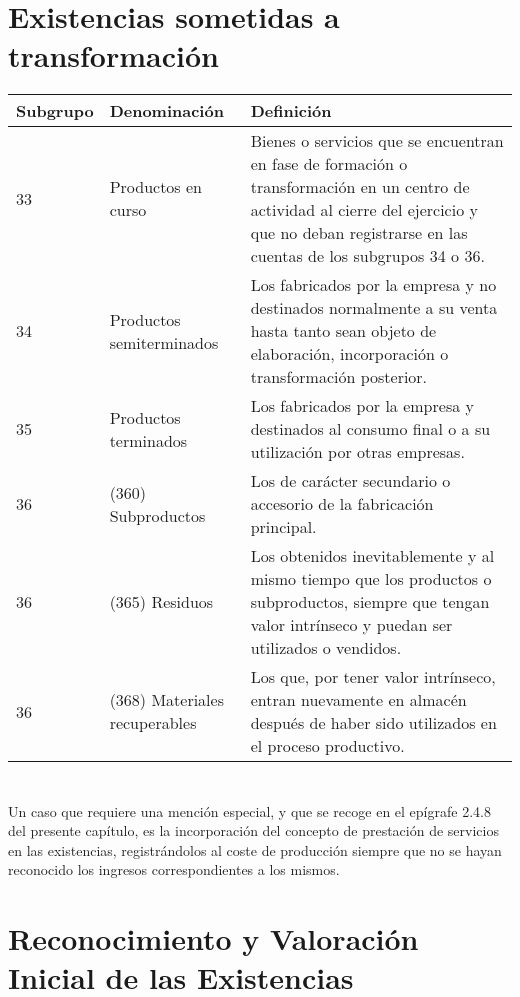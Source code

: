 \documentclass{article}
\begin{document}
\section*{Existencias sometidas a transformación}

\begin{tabular}{|p{4cm}|p{4cm}|p{4cm}|}
\hline
\textbf{Subgrupo} & \textbf{Denominación} & \textbf{Definición} \\
\hline
33 & Productos en curso & Bienes o servicios que se encuentran en fase de formación o transformación en un centro de actividad al cierre del ejercicio y que no deban registrarse en las cuentas de los subgrupos 34 o 36. \\
\hline
34 & Productos semiterminados & Los fabricados por la empresa y no destinados normalmente a su venta hasta tanto sean objeto de elaboración, incorporación o transformación posterior. \\
\hline
35 & Productos terminados & Los fabricados por la empresa y destinados al consumo final o a su utilización por otras empresas. \\
\hline
36 & (360) Subproductos & Los de carácter secundario o accesorio de la fabricación principal. \\
\hline
36 & (365) Residuos & Los obtenidos inevitablemente y al mismo tiempo que los productos o subproductos, siempre que tengan valor intrínseco y puedan ser utilizados o vendidos. \\
\hline
36 & (368) Materiales recuperables & Los que, por tener valor intrínseco, entran nuevamente en almacén después de haber sido utilizados en el proceso productivo. \\
\hline
\end{tabular}

\section*{}

Un caso que requiere una mención especial, y que se recoge en el epígrafe 2.4.8 del presente capítulo, es la incorporación del concepto de prestación de servicios en las existencias, registrándolos al coste de producción siempre que no se hayan reconocido los ingresos correspondientes a los mismos.

\section{Reconocimiento y Valoración Inicial de las Existencias}
\end{document}
